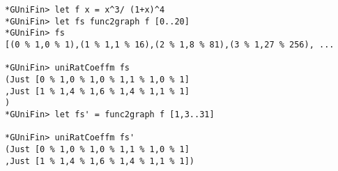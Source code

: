 \documentclass[10pt]{article}
\begin{document}
\begin{verbatim}
*GUniFin> let f x = x^3/ (1+x)^4
*GUniFin> let fs func2graph f [0..20]
*GUniFin> fs
[(0 % 1,0 % 1),(1 % 1,1 % 16),(2 % 1,8 % 81),(3 % 1,27 % 256), ...

*GUniFin> uniRatCoeffm fs
(Just [0 % 1,0 % 1,0 % 1,1 % 1,0 % 1]
,Just [1 % 1,4 % 1,6 % 1,4 % 1,1 % 1]
)
*GUniFin> let fs' = func2graph f [1,3..31]

*GUniFin> uniRatCoeffm fs'
(Just [0 % 1,0 % 1,0 % 1,1 % 1,0 % 1]
,Just [1 % 1,4 % 1,6 % 1,4 % 1,1 % 1])
\end{verbatim}
\end{document}
